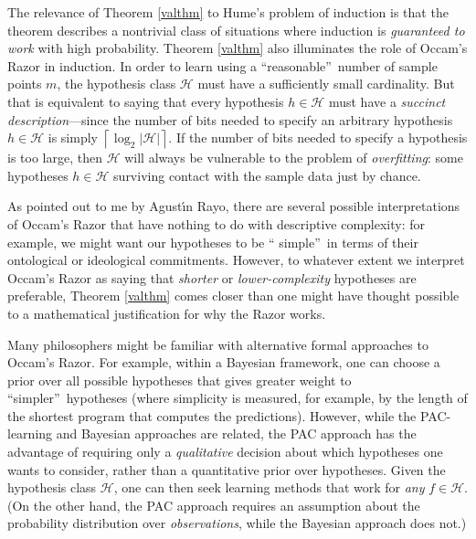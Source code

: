 \documentclass[12pt,onecolumn]{article}%
\begin{document}
The relevance of Theorem \ref{valthm} to Hume's problem of induction is that
the theorem describes a nontrivial class of situations where induction is
\textit{guaranteed to work} with high probability. Theorem \ref{valthm}
also illuminates the role of Occam's Razor in induction. In order to learn
using a \textquotedblleft reasonable\textquotedblright\  number of sample
points $m$, the hypothesis class $\mathcal{H}$ must have a sufficiently small
cardinality. But that is equivalent to saying that every hypothesis
$h\in\mathcal{H}$ must have a \textit{succinct description}---since the
number of bits needed to specify an arbitrary hypothesis $h\in\mathcal{H}$ is
simply $\left\lceil \log_{2}\left\vert \mathcal{H}\right\vert \right\rceil $.
 If the number of bits needed to specify a hypothesis is too large, then
$\mathcal{H}$ will always be vulnerable to the problem of
\textit{overfitting}: some hypotheses $h\in\mathcal{H}$ surviving contact
with the sample data just by chance.

As pointed out to me by Agust\'{\i}n Rayo, there are several possible
interpretations of Occam's Razor that have nothing to do with descriptive
complexity: for example, we might want our hypotheses to be \textquotedblleft
simple\textquotedblright\  in terms of their ontological or ideological
commitments. However, to whatever extent we interpret Occam's Razor as
saying that \textit{shorter} or \textit{lower-complexity} hypotheses are
preferable, Theorem \ref{valthm} comes closer than one might have thought
possible to a mathematical justification for why the Razor works.

Many philosophers might be familiar with alternative formal approaches to
Occam's Razor. For example, within a Bayesian framework, one can choose a
prior over all possible hypotheses that gives greater weight to
\textquotedblleft simpler\textquotedblright\  hypotheses (where simplicity is
measured, for example, by the length of the shortest program that computes the
predictions). However, while the PAC-learning and Bayesian approaches are
related, the PAC approach has the advantage of requiring only a
\textit{qualitative} decision about which hypotheses one wants to consider,
rather than a quantitative prior over hypotheses. Given the hypothesis class
$\mathcal{H}$, one can then seek learning methods that work for \textit{any}
$f\in\mathcal{H}$. (On the other hand, the PAC approach requires an
assumption about the probability distribution over \textit{observations},
while the Bayesian approach does not.)
\end{document}
